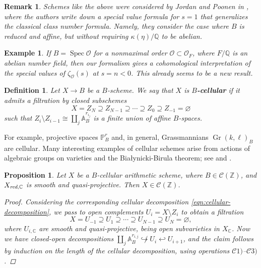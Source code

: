 \documentclass[10pt,a4paper,oneside]{article}
\DeclareMathOperator{\Spec}{Spec}
\newcommand{\CC}{\mathbb{C}}
\newcommand{\QQ}{\mathbb{Q}}
\newcommand{\ZZ}{\mathbb{Z}}
\renewcommand{\AA}{\mathbb{A}}
\newcommand{\PP}{\mathbb{P}}
\DeclareMathOperator{\Gr}{Gr}
\renewcommand{\emptyset}{\varnothing}
\newcommand{\red}{\text{\it red}}
\theoremstyle{myplain}
\newtheorem{proposition}[theorem]{Proposition}
\theoremstyle{mydefinition}
\newtheorem{definition}[theorem]{Definition}
\newtheorem{remark}[theorem]{Remark}
\newtheorem{example}[theorem]{Example}
\numberwithin{equation}{section}
\begin{document}
\begin{remark}
  Schemes like the above were considered by Jordan and Poonen in
  \cite{Jordan-Poonen-2020}, where the authors write down a special value
  formula for $s = 1$ that generalizes the classical class number
  formula. Namely, they consider the case where $B$ is reduced and affine,
  but without requiring $\kappa (\eta)/\QQ$ to be abelian.
\end{remark}

\begin{example}
  If $B = \Spec \mathcal{O}$ for a nonmaximal order
  $\mathcal{O} \subset \mathcal{O}_F$, where $F/\QQ$ is an abelian number field,
  then our formalism gives a cohomological interpretation of the special values
  of $\zeta_\mathcal{O} (s)$ at $s = n < 0$. This already seems to be a new
  result.
\end{example}

\begin{definition}
  \label{dfn:B-cellular-scheme}
  Let $X \to B$ be a $B$-scheme. We say that $X$ is \textbf{$B$-cellular} if it
  admits a filtration by closed subschemes
  \begin{equation}
    \label{eqn:cellular-decomposition}
    X = Z_N \supseteq Z_{N-1} \supseteq \cdots \supseteq Z_0 \supseteq Z_{-1} = \emptyset
  \end{equation}
  such that $Z_i\setminus Z_{i-1} \cong \coprod_j \AA^{r_{i_j}}_B$ is a finite
  union of affine $B$-spaces.
\end{definition}

For example, projective spaces $\PP^r_B$ and, in general, Grassmannians
$\Gr (k,\ell)_B$ are cellular. Many interesting examples of cellular schemes
arise from actions of algebraic groups on varieties and the Bia\l{}ynicki-Birula
theorem; see \cite{Wendt-2010} and \cite{Brosnan-2005}.

\begin{proposition}
  \label{prop:cellular-schemes-in-C(Z)}
  Let $X$ be a $B$-cellular arithmetic scheme, where $B \in \mathcal{C} (\ZZ)$,
  and $X_{\red,\CC}$ is smooth and quasi-projective. Then
  $X \in \mathcal{C} (\ZZ)$.

  \begin{proof}
    Considering the corresponding cellular decomposition
    \eqref{eqn:cellular-decomposition}, we pass to open complements
    $U_i = X\setminus Z_i$ to obtain a filtration
    $$X = U_{-1} \supseteq U_1 \supseteq \cdots \supseteq U_{N-1} \supseteq U_N = \emptyset,$$
    where $U_{i,\CC}$ are smooth and quasi-projective, being \emph{open}
    subvarieties in $X_\CC$. Now we have closed-open decompositions
    $\coprod_j \AA^{r_{i,j}}_B \not\hookrightarrow U_i \hookleftarrow U_{i+1}$,
    and the claim follows by induction on the length of the cellular
    decomposition, using operations $\mathcal{C}1)$--$\mathcal{C}3)$.
  \end{proof}
\end{proposition}
\end{document}
